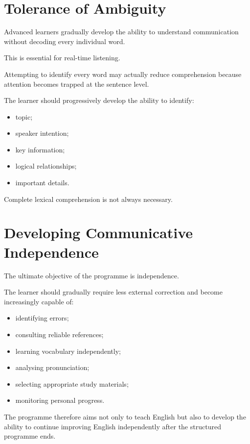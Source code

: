 \section*{Tolerance of Ambiguity}

Advanced learners gradually develop the ability to understand communication without decoding every individual word.

This is essential for real-time listening.

Attempting to identify every word may actually reduce comprehension because attention becomes trapped at the sentence level.

The learner should progressively develop the ability to identify:

\begin{itemize}
    \item topic;
    \item speaker intention;
    \item key information;
    \item logical relationships;
    \item important details.
\end{itemize}

Complete lexical comprehension is not always necessary.

\section*{Developing Communicative Independence}

The ultimate objective of the programme is independence.

The learner should gradually require less external correction and become increasingly capable of:

\begin{itemize}
    \item identifying errors;
    \item consulting reliable references;
    \item learning vocabulary independently;
    \item analysing pronunciation;
    \item selecting appropriate study materials;
    \item monitoring personal progress.
\end{itemize}

The programme therefore aims not only to teach English but also to develop the ability to continue improving English independently after the structured programme ends.


